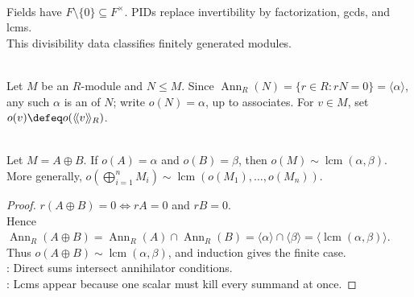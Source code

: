 \begin{perspective} \label{per:pid-modules-scalar-arithmetic-controls-structure} \\
Fields have $F\setminus\{0\}\subseteq F^\times$. PIDs replace invertibility by factorization, gcds, and lcms.\\
This divisibility data classifies finitely generated modules.
\end{perspective}

\begin{definition} \label{def:module-order-over-pid} \\
Let $M$ be an $R$-module and $N\leq M$. Since $\operatorname{Ann}_R(N)=\{r\in R:rN=0\}=\langle\alpha\rangle$, any such $\alpha$ is an  of $N$; write $o(N)=\alpha$, up to associates. For $v\in M$, set $o(v)\defeq o(\langle\!\langle v\rangle\!\rangle_R)$.
\end{definition}

\begin{proposition} \label{prop:orders-direct-sum-lcm} \\
Let $M=A\oplus B$. If $o(A)=\alpha$ and $o(B)=\beta$, then $o(M)\sim\operatorname{lcm}(\alpha,\beta)$.\\
More generally, $o(\bigoplus\limits_{i=1}^{n}M_i)\sim\operatorname{lcm}(o(M_1),\ldots,o(M_n))$.
\begin{proof}
$r(A\oplus B)=0\Longleftrightarrow rA=0$ and $rB=0$.\\
Hence $\operatorname{Ann}_R(A\oplus B)=\operatorname{Ann}_R(A)\cap\operatorname{Ann}_R(B) =\langle\alpha\rangle\cap\langle\beta\rangle =\langle\operatorname{lcm}(\alpha,\beta)\rangle$.\\
Thus $o(A\oplus B)\sim\operatorname{lcm}(\alpha,\beta)$, and induction gives the finite case.\\
: Direct sums intersect annihilator conditions.\\
: Lcms appear because one scalar must kill every summand at once.
\end{proof}
\end{proposition}

